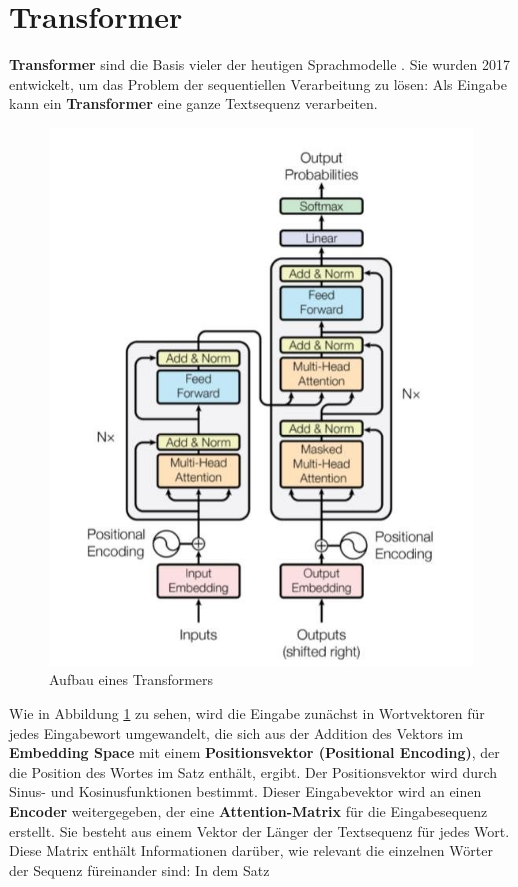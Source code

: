 \section{Transformer}
\textbf{Transformer} sind die Basis vieler der heutigen Sprachmodelle \cite{bert}\cite{gpt}. Sie wurden 2017 entwickelt, um das Problem der sequentiellen Verarbeitung zu l\"osen: Als Eingabe kann ein \textbf{Transformer} eine ganze Textsequenz verarbeiten.\\
\begin{figure}[!ht]
\centering
\includegraphics{pics/attention.jpg}
\caption{Aufbau eines Transformers \cite{attention}}
\label{fig:attention}
\end{figure}
Wie in Abbildung \ref{fig:attention} zu sehen, wird die Eingabe zun\"achst in Wortvektoren f\"ur jedes Eingabewort umgewandelt, die sich aus der Addition des Vektors im \textbf{Embedding Space} mit einem \textbf{Positionsvektor (Positional Encoding)}, der die Position des Wortes im Satz enth\"alt, ergibt. Der Positionsvektor wird durch Sinus- und Kosinusfunktionen bestimmt. Dieser Eingabevektor wird an einen \textbf{Encoder} weitergegeben, der eine \textbf{Attention-Matrix} f\"ur die Eingabesequenz erstellt. Sie besteht aus einem Vektor der L\"anger der Textsequenz f\"ur jedes Wort. Diese Matrix enth\"alt Informationen dar\"uber, wie relevant die einzelnen W\"orter der Sequenz f\"ureinander sind: In dem Satz
